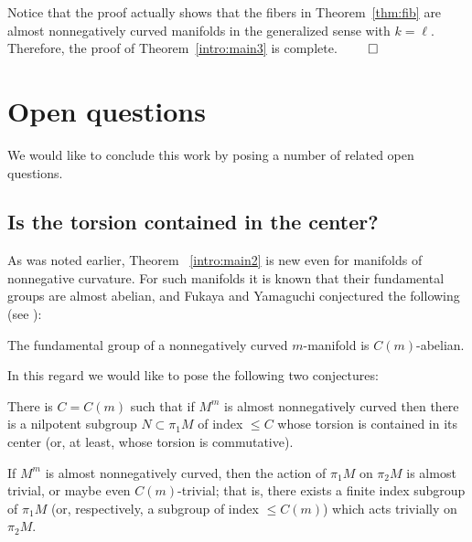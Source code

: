 \documentclass{amsart}
\begin{document}
Notice that the proof actually shows
that the fibers in Theorem~\ref{thm:fib} are almost nonnegatively curved manifolds
in the generalized sense with $k=\ell$. Therefore,
 the proof of Theorem~\ref{intro:main3} is complete. \hfill$\qed$



\section{Open questions}
We would like to conclude this work by posing a number of related open questions.

\subsection{Is the torsion contained in the center?}
As was noted earlier, Theorem ~\ref{intro:main2} is new even for manifolds of nonnegative curvature.
For such manifolds it is known that their fundamental groups  are almost abelian,
and Fukaya and Yamaguchi conjectured the following  (see \cite{FY}):

\begin{conj}\label{con:c-ab}
The fundamental group of a nonnegatively curved  $m$-manifold is $C(m)$-abelian.
\end{conj}




In this regard we would like to pose the following two conjectures:

\begin{mconj}\label{con:tor}
There is $C=C(m)$ such that if $M^m$ is almost nonnegatively curved then there is a nilpotent subgroup $N\subset \pi_1M$ of index $\le C$ whose torsion is contained in its center (or, at least, whose torsion is commutative).
\end{mconj}

\begin{conj}\label{pi_2}
If $M^m$ is almost nonnegatively curved,
then the action of $\pi_1M$ on $\pi_2M$ is almost trivial, or maybe even $C(m)$-trivial;
that is, there exists a finite index subgroup of $\pi_1M$
(or, respectively,  a subgroup of index $\le C(m)$)
which acts trivially on $\pi_2M$.
\end{conj}

\end{document}
